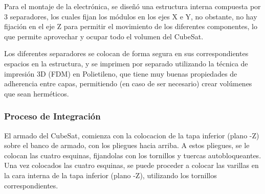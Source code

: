       Para el montaje de la electrónica, se diseñó una estructura interna compuesta por 3 separadores,
      los cuales fijan los módulos en los ejes X e Y, no obstante, no hay fijación en el eje Z para
      permitir el movimiento de los diferentes componentes, lo que permite aprovechar y ocupar todo el
      volumen del CubeSat.

      Los diferentes separadores se colocan de forma segura en sus correspondientes espacios en la
      estructura, y se imprimen por separado utilizando la técnica de impresión 3D (FDM) en Polietileno,
      que tiene muy buenas propiedades de adherencia entre capas, permitiendo (en caso de ser necesario)
      crear volúmenes que sean herméticos.
    \subsubsection{Proceso de Integración}

      El armado del CubeSat, comienza con la colocacion de la tapa inferior (plano -Z) sobre
      el banco de armado, con los pliegues hacia arriba. A estos pliegues, se le colocan las cuatro
      esquinas, fijandolas con los tornillos y tuercas autobloqueantes. Una vez colocados las cuatro
      esquinas, se puede proceder a colocar las varillas en la cara interna de la tapa inferior (plano
      -Z), utilizando los tornillos correspondientes.

